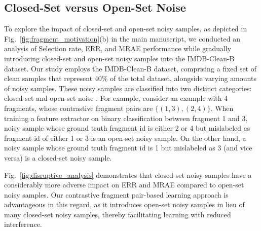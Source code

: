 \documentclass{article}
\theoremstyle{plain}
\theoremstyle{definition}
\theoremstyle{remark}
\begin{document}
\subsection{Closed-Set versus Open-Set Noise}\label{subsec:disruptive_anomaly_noise}
To explore the impact of closed-set and open-set noisy samples, as depicted in Fig.~\ref{fig:fragment_motivation}(b) in the main manuscript, we conducted an analysis of Selection rate, ERR, and MRAE performance while gradually introducing closed-set and open-set noisy samples into the IMDB-Clean-B dataset.
Our study employs the IMDB-Clean-B dataset, comprising a fixed set of clean samples that represent 40\% of the total dataset, alongside varying amounts of noisy samples. 
These noisy samples are classified into two distinct categories: closed-set and open-set noise \citep{wei2021open, wan2024unlocking}. 
For example, consider an example with 4 fragments, whose contrastive fragment pairs are $\{(1, 3), (2, 4)\}$.
When training a feature extractor on binary classification between fragment 1 and 3, noisy sample whose ground truth fragment id is either 2 or 4 but mislabeled as fragment id of either 1 or 3 is an open-set noisy sample.
On the other hand, a noisy sample whose ground truth fragment id is 1 but mislabeled as 3 (and vice versa) is a closed-set noisy sample.


Fig.~\ref{fig:disruptive_analysis} demonstrates that closed-set noisy samples have a considerably more adverse impact on ERR and MRAE compared to open-set noisy samples. 
Our contrastive fragment pair-based learning approach is advantageous in this regard, as it introduces open-set noisy samples in lieu of many closed-set noisy samples, thereby facilitating learning with reduced interference.
\end{document}
